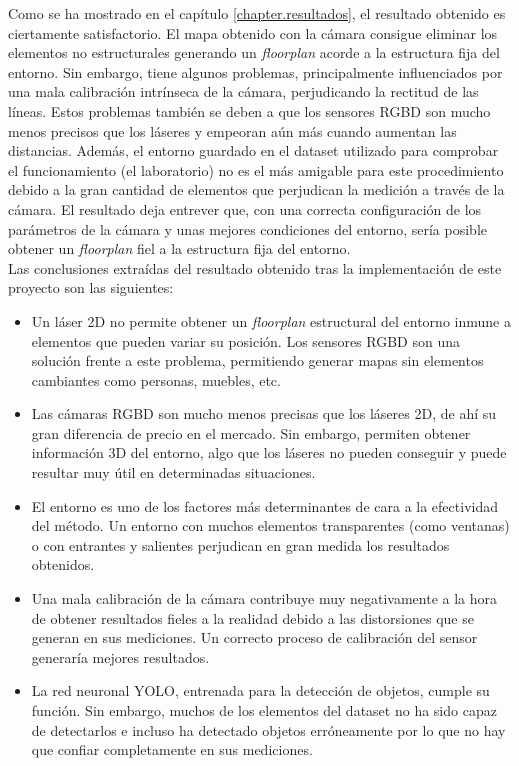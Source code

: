 Como se ha mostrado en el capítulo \ref{chapter.resultados}, el resultado obtenido es ciertamente satisfactorio. El mapa obtenido con la cámara consigue eliminar los elementos no estructurales generando un \textit{floorplan} acorde a la estructura fija del entorno. Sin embargo, tiene algunos problemas, principalmente influenciados por una mala calibración intrínseca de la cámara, perjudicando la rectitud de las líneas. Estos problemas también se deben a que los sensores RGBD son mucho menos precisos que los láseres y empeoran aún más cuando aumentan las distancias. Además, el entorno guardado en el dataset utilizado para comprobar el funcionamiento (el laboratorio) no es el más amigable para este procedimiento debido a la gran cantidad de elementos que perjudican la medición a través de la cámara. El resultado deja entrever que, con una correcta configuración de los parámetros de la cámara y unas mejores condiciones del entorno, sería posible obtener un  \textit{floorplan} fiel a la estructura fija del entorno.\\

Las conclusiones extraídas del resultado obtenido tras la implementación de este proyecto son las siguientes:

\begin{itemize}
	\item Un láser 2D no permite obtener un \textit{floorplan} estructural del entorno inmune a elementos que pueden variar su posición. Los sensores RGBD son una solución frente a este problema, permitiendo generar mapas sin elementos cambiantes como personas, muebles, etc.
	\item Las cámaras RGBD son mucho menos precisas que los láseres 2D, de ahí su gran diferencia de precio en el mercado. Sin embargo, permiten obtener información 3D del entorno, algo que los láseres no pueden conseguir y puede resultar muy útil en determinadas situaciones.
	\item El entorno es uno de los factores más determinantes de cara a la efectividad del método. Un entorno con muchos elementos transparentes (como ventanas) o con entrantes y salientes perjudican en gran medida los resultados obtenidos.
	\item Una mala calibración de la cámara contribuye muy negativamente a la hora de obtener resultados fieles a la realidad debido a las distorsiones que se generan en sus mediciones. Un correcto proceso de calibración del sensor generaría mejores resultados.
	\item La red neuronal YOLO, entrenada para la detección de objetos, cumple su función. Sin embargo, muchos de los elementos del dataset no ha sido capaz de detectarlos e incluso ha detectado objetos erróneamente por lo que no hay que confiar completamente en sus mediciones. 
	
\end{itemize}

